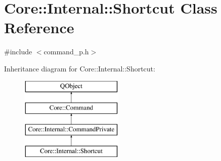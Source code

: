 \hypertarget{class_core_1_1_internal_1_1_shortcut}{\section{Core\-:\-:Internal\-:\-:Shortcut Class Reference}
\label{class_core_1_1_internal_1_1_shortcut}
}


{\ttfamily \#include $<$command\-\_\-p.\-h$>$}

Inheritance diagram for Core\-:\-:Internal\-:\-:Shortcut\-:\begin{figure}[H]
\begin{center}
\leavevmode
\includegraphics[height=4.000000cm]{class_core_1_1_internal_1_1_shortcut}
\end{center}
\end{figure}
